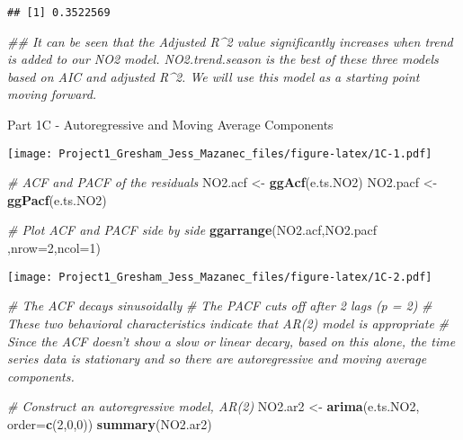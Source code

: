 \documentclass[
]{article}
\newenvironment{Shaded}{\begin{snugshade}}{\end{snugshade}}
\newcommand{\CommentTok}[1]{\textcolor[rgb]{0.56,0.35,0.01}{\textit{#1}}}
\newcommand{\DataTypeTok}[1]{\textcolor[rgb]{0.13,0.29,0.53}{#1}}
\newcommand{\DecValTok}[1]{\textcolor[rgb]{0.00,0.00,0.81}{#1}}
\newcommand{\KeywordTok}[1]{\textcolor[rgb]{0.13,0.29,0.53}{\textbf{#1}}}
\newcommand{\NormalTok}[1]{#1}
\newcommand{\OperatorTok}[1]{\textcolor[rgb]{0.81,0.36,0.00}{\textbf{#1}}}
\newcommand{\StringTok}[1]{\textcolor[rgb]{0.31,0.60,0.02}{#1}}
\begin{document}
\begin{verbatim}
## [1] 0.3522569
\end{verbatim}

\begin{Shaded}
\begin{Highlighting}[]
\CommentTok{## It can be seen that the Adjusted R^2 value significantly increases when trend is added to our NO2 model. NO2.trend.season is the best of these three models based on AIC and adjusted R^2. We will use this model as a starting point moving forward.}
\end{Highlighting}
\end{Shaded}

Part 1C - Autoregressive and Moving Average Components

\begin{Shaded}
\end{Shaded}

\texttt{[image: Project1\_Gresham\_Jess\_Mazanec\_files/figure-latex/1C-1.pdf]}

\begin{Shaded}
\begin{Highlighting}[]
\CommentTok{# ACF and PACF of the residuals}
\NormalTok{NO2.acf <-}\StringTok{ }\KeywordTok{ggAcf}\NormalTok{(e.ts.NO2)}
\NormalTok{NO2.pacf <-}\StringTok{ }\KeywordTok{ggPacf}\NormalTok{(e.ts.NO2)}

\CommentTok{# Plot ACF and PACF side by side}
\KeywordTok{ggarrange}\NormalTok{(NO2.acf,NO2.pacf ,}\DataTypeTok{nrow=}\DecValTok{2}\NormalTok{,}\DataTypeTok{ncol=}\DecValTok{1}\NormalTok{)}
\end{Highlighting}
\end{Shaded}

\texttt{[image: Project1\_Gresham\_Jess\_Mazanec\_files/figure-latex/1C-2.pdf]}

\begin{Shaded}
\begin{Highlighting}[]
\CommentTok{# The ACF decays sinusoidally}
\CommentTok{# The PACF cuts off after 2 lags (p = 2)}
\CommentTok{# These two behavioral characteristics indicate that AR(2) model is appropriate}
\CommentTok{# Since the ACF doesn't show a slow or linear decary, based on this alone, the time series data is stationary and so there are autoregressive and moving average components.}

\CommentTok{# Construct an autoregressive model, AR(2)}
\NormalTok{NO2.ar2 <-}\StringTok{ }\KeywordTok{arima}\NormalTok{(e.ts.NO2, }\DataTypeTok{order=}\KeywordTok{c}\NormalTok{(}\DecValTok{2}\NormalTok{,}\DecValTok{0}\NormalTok{,}\DecValTok{0}\NormalTok{))}
\KeywordTok{summary}\NormalTok{(NO2.ar2)}
\end{Highlighting}
\end{Shaded}
\end{document}
